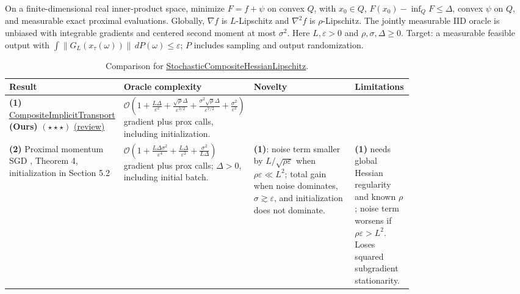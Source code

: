 \begin{table}[tp]
\centering
\caption{Comparison for \href{https://github.com/k3nfalt/longtails/blob/main/LongTails/Setups/StochasticCompositeHessianLipschitz.lean}{StochasticCompositeHessianLipschitz}.}\label{tab:StochasticCompositeHessianLipschitz}
\parbox{\linewidth}{\footnotesize On a finite-dimensional real inner-product space, minimize $F=f+\psi$ on convex $Q$, with $x_0\in Q$, $F(x_0)-\inf_Q F\le\Delta$, convex $\psi$ on $Q$, and measurable exact proximal evaluations. Globally, $\nabla f$ is $L$-Lipschitz and $\nabla^2f$ is $\rho$-Lipschitz. The jointly measurable IID oracle is unbiased with integrable gradients and centered second moment at most $\sigma^2$. Here $L,\varepsilon>0$ and $\rho,\sigma,\Delta\ge0$. Target: a measurable feasible output with $\int\|G_L(x_\tau(\omega))\|\,dP(\omega)\le\varepsilon$; $P$ includes sampling and output randomization.}\par\smallskip
\begin{threeparttable}
\footnotesize
\setlength{\tabcolsep}{4pt}\renewcommand{\arraystretch}{1.25}
\begin{tabularx}{\linewidth}{@{}>{\raggedright\arraybackslash}p{0.20\linewidth}>{\raggedright\arraybackslash}p{0.32\linewidth}>{\raggedright\arraybackslash}p{0.25\linewidth}>{\raggedright\arraybackslash}X@{}}
\toprule
\textbf{Result} & \textbf{Oracle complexity} & \textbf{Novelty} & \textbf{Limitations} \\
\midrule
\textbf{(1)} \href{https://github.com/k3nfalt/longtails/blob/main/LongTails/Theorems/CompositeImplicitTransport.lean}{Composite\allowbreak Implicit\allowbreak Transport} \textbf{(Ours)} $(\star\star\star)$ \href{https://github.com/k3nfalt/longtails/blob/main/scripts/reviews/CompositeImplicitTransport.md}{(review)} & $\mathcal{O}\!\left(1+\frac{L\Delta}{\varepsilon^2}+\frac{\sqrt\rho\Delta}{\varepsilon^{3/2}}+\frac{\sigma^2\sqrt\rho\Delta}{\varepsilon^{7/2}}+\frac{\sigma^2}{\varepsilon^2}\right)$ gradient plus prox calls, including initialization. & & \\
\midrule[1.2pt]
\textbf{(2)} Proximal momentum SGD \citep{schlGao2024v3}, Theorem 4, initialization in Section 5.2 & $\mathcal{O}\!\left(1+\frac{L\Delta\sigma^2}{\varepsilon^4}+\frac{L\Delta}{\varepsilon^2}+\frac{\sigma^2}{L\Delta}\right)$ gradient plus prox calls; $\Delta>0$, including initial batch. & \textbf{(1)}: noise term smaller by $L/\sqrt{\rho\varepsilon}$ when $\rho\varepsilon\ll L^2$; total gain when noise dominates, $\sigma\gtrsim\varepsilon$, and initialization does not dominate. & \textbf{(1)} needs global Hessian regularity and known $\rho$; noise term worsens if $\rho\varepsilon>L^2$. Loses squared subgradient stationarity. \\

\end{tabularx}
\end{threeparttable}
\end{table}
